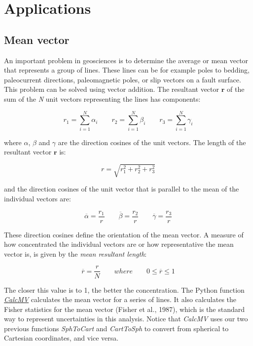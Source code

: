 \documentclass[a4paper , 12pt]{book}
\begin{document}
\section{Applications}

\subsection{Mean vector}

An important problem in geosciences is to determine the average or mean vector that represents a group of lines. These lines can be for example poles to bedding, paleocurrent directions, paleomagnetic poles, or slip vectors on a fault surface. This problem can be solved using vector addition. The resultant vector $\mathbf{r}$ of the sum of the \textit{N} unit vectors representing the lines has components:

\begin{equation}
    r_1=\sum_{i=1}^{N}\alpha_i\qquad r_2=\sum_{i=1}^{N}\beta_i\qquad r_3=\sum_{i=1}^{N}\gamma_i \tag{4.15a}
\end{equation}

where $\alpha$, $\beta$ and $\gamma$ are the direction cosines of the unit vectors. The length of the resultant vector $\mathbf{r}$ is:

\begin{equation}
    r=\sqrt{r_1^2+r_2^2+r_3^2} \tag{4.15b}
\end{equation}

and the direction cosines of the unit vector that is parallel to the mean of the individual vectors are:

\begin{equation}
    \overline{\alpha}=\frac{r_1}{r}\qquad \overline{\beta}=\frac{r_2}{r}\qquad \overline{\gamma}=\frac{r_3}{r} \tag{4.15c}
\end{equation}

These direction cosines define the orientation of the mean vector. A measure of how concentrated the individual vectors are or how representative the mean vector is, is given by the \textit{mean resultant length}:

\begin{equation}
    \overline{r}=\frac{r}{N}\qquad where\qquad 0\leq\overline{r}\leq 1 \tag{4.15d}
\end{equation}

The closer this value is to 1, the better the concentration. The Python function \href{http://github.com}{\textit{CalcMV}} calculates the mean vector for a series of lines. It also calculates the Fisher statistics for the mean vector (Fisher et al., 1987), which is the standard way to represent uncertainties in this analysis. Notice that \textit{CalcMV} uses our two previous functions \textit{SphToCart} and \textit{CartToSph} to convert from spherical to Cartesian coordinates, and vice versa.
\end{document}

